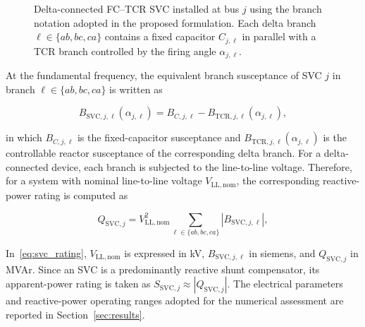 \documentclass[journal]{IEEEtran}
\begin{document}
\begin{figure}[!t]
{%
}
    \caption{Delta-connected FC--TCR SVC installed at bus $j$ using the
    branch notation adopted in the proposed formulation. Each delta branch
    $\ell\in\{ab,bc,ca\}$ contains a fixed capacitor $C_{j,\ell}$ in parallel
    with a TCR branch controlled by the firing angle $\alpha_{j,\ell}$.}
    \label{fig:delta_fc_tcr_svc}
\end{figure}

At the fundamental frequency, the equivalent branch susceptance of SVC $j$ in
branch $\ell \in \{ab,bc,ca\}$ is written as~\cite{MathurVarma2002}

\begin{equation}
    B_{\mathrm{SVC},j,\ell}(\alpha_{j,\ell}) =
    B_{C,j,\ell} - B_{\mathrm{TCR},j,\ell}(\alpha_{j,\ell}),
    \label{eq:svc_susceptance}
\end{equation}

\noindent in which $B_{C,j,\ell}$ is the fixed-capacitor susceptance and
$B_{\mathrm{TCR},j,\ell}(\alpha_{j,\ell})$ is the controllable reactor
susceptance of the corresponding delta branch. For a delta-connected device,
each branch is subjected to the line-to-line voltage. Therefore, for a system
with nominal line-to-line voltage $V_{\mathrm{LL,nom}}$, the corresponding
reactive-power rating is computed as

\begin{equation}
    Q_{\mathrm{SVC},j} = V_{\mathrm{LL,nom}}^2
    \sum_{\ell \in \{ab,bc,ca\}} \left|B_{\mathrm{SVC},j,\ell}\right|,
    \label{eq:svc_rating}
\end{equation}

In~\eqref{eq:svc_rating}, $V_{\mathrm{LL,nom}}$ is expressed in kV,
$B_{\mathrm{SVC},j,\ell}$ in siemens, and $Q_{\mathrm{SVC},j}$ in MVAr. Since
an SVC is a predominantly reactive
shunt compensator, its apparent-power rating is taken as
$S_{\mathrm{SVC},j} \approx |Q_{\mathrm{SVC},j}|$. The electrical
parameters and reactive-power operating ranges adopted for the numerical
assessment are reported in Section~\ref{sec:results}.
\end{document}
